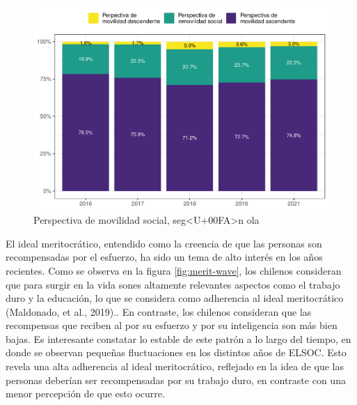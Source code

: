 \documentclass[
  12pt,
]{book}
\begin{document}
\begin{figure}

{\centering \includegraphics{reporte-elsoc_files/figure-latex/mov-soc-rec-1} 

}

\caption{Perspectiva de movilidad social, seg<U+00FA>n ola}\label{fig:mov-soc-rec}
\end{figure}

El ideal meritocrático, entendido como la creencia de que las personas son recompensadas por el esfuerzo, ha sido un tema de alto interés en los años recientes. Como se observa en la figura \ref{fig:merit-wave}, los chilenos consideran que para surgir en la vida sones altamente relevantes aspectos como el trabajo duro y la educación, lo que se considera como adherencia al ideal meritocrático (Maldonado, et al., 2019).. En contraste, los chilenos consideran que las recompensas que reciben al por su esfuerzo y por su inteligencia son más bien bajas. Es interesante constatar lo estable de este patrón a lo largo del tiempo, en donde se observan pequeñas fluctuaciones en los distintos años de ELSOC. Esto revela una alta adherencia al ideal meritocrático, reflejado en la idea de que las personas deberían ser recompensadas por su trabajo duro, en contraste con una menor percepción de que esto ocurre.
\end{document}
